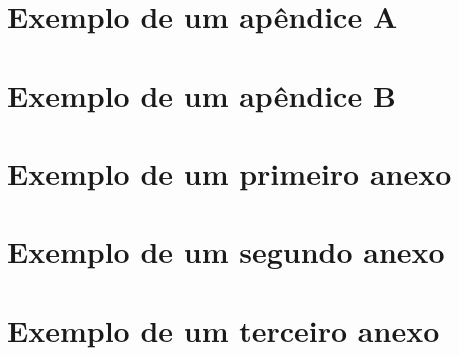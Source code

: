 \documentclass[
	12pt,				%
	openright,			%
	oneside,
	a4paper,			%
	english,			%
	french,				%
	spanish,			%
	brazil,				%
	]{abntex2}
\begin{document}
%
%



%
%


\begin{apendicesenv}

\partapendices

\chapter{Exemplo de um apêndice A}



\chapter{Exemplo de um apêndice B}


\end{apendicesenv}



\begin{anexosenv}

\partanexos

\chapter{Exemplo de um primeiro anexo}


\chapter{Exemplo de um segundo anexo}



\chapter{Exemplo de um terceiro anexo}



\end{anexosenv}



\printindex
\end{document}
